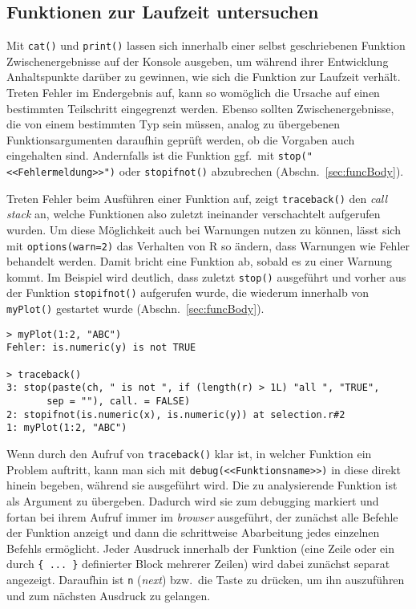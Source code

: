 \subsection{Funktionen zur Laufzeit untersuchen}
\label{sec:debugRun}

Mit \lstinline!cat()! und \lstinline!print()! lassen sich innerhalb einer selbst geschriebenen Funktion Zwischenergebnisse auf der Konsole ausgeben, um während ihrer Entwicklung Anhaltspunkte darüber zu gewinnen, wie sich die Funktion zur Laufzeit verhält. Treten Fehler im Endergebnis auf, kann so womöglich die Ursache auf einen bestimmten Teilschritt eingegrenzt werden. Ebenso sollten Zwischenergebnisse, die von einem bestimmten Typ sein müssen, analog zu übergebenen Funktionsargumenten daraufhin geprüft werden, ob die Vorgaben auch eingehalten sind. Andernfalls ist die Funktion ggf.\ mit \lstinline!stop("<<Fehlermeldung>>")! oder \lstinline!stopifnot()! abzubrechen (Abschn.\ \ref{sec:funcBody}).

Treten Fehler beim Ausführen einer Funktion auf, zeigt \lstinline!traceback()! den \emph{call stack} an, welche Funktionen also zuletzt ineinander verschachtelt aufgerufen wurden. Um diese Möglichkeit auch bei Warnungen nutzen zu können, lässt sich mit \lstinline!options(warn=2)! das Verhalten von R so ändern, dass Warnungen wie Fehler behandelt werden. Damit bricht eine Funktion ab, sobald es zu einer Warnung kommt. Im Beispiel wird deutlich, dass zuletzt \lstinline!stop()! ausgeführt und vorher aus der Funktion \lstinline!stopifnot()! aufgerufen wurde, die wiederum innerhalb von \lstinline!myPlot()! gestartet wurde (Abschn.\ \ref{sec:funcBody}).
\begin{lstlisting}
> myPlot(1:2, "ABC")
Fehler: is.numeric(y) is not TRUE

> traceback()
3: stop(paste(ch, " is not ", if (length(r) > 1L) "all ", "TRUE",
       sep = ""), call. = FALSE)
2: stopifnot(is.numeric(x), is.numeric(y)) at selection.r#2
1: myPlot(1:2, "ABC")
\end{lstlisting}

Wenn durch den Aufruf von \lstinline!traceback()! klar ist, in welcher Funktion ein Problem auftritt, kann man sich mit  \lstinline!debug(<<Funktionsname>>)! in diese direkt hinein begeben, während sie ausgeführt wird. Die zu analysierende Funktion ist als Argument zu übergeben. Dadurch wird sie zum debugging markiert und fortan bei ihrem Aufruf immer im \emph{browser} ausgeführt, der zunächst alle Befehle der Funktion anzeigt und dann die schrittweise Abarbeitung jedes einzelnen Befehls ermöglicht. Jeder Ausdruck innerhalb der Funktion (eine Zeile oder ein durch \lstinline!{ ... }! definierter Block mehrerer Zeilen) wird dabei zunächst separat angezeigt. Daraufhin ist \lstinline!n! (\emph{next}) bzw.\ die  Taste zu drücken, um ihn auszuführen und zum nächsten Ausdruck zu gelangen.

